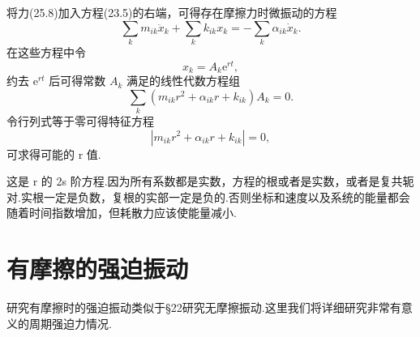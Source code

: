 将力(25.8)加入方程(23.5)的右端，可得存在摩擦力时微振动的方程
\begin{equation}
  \sum_km_{ik}\ddot{x}_k+\sum_kk_{ik}x_k=-\sum_k\alpha_{ik}\dot{x}_k.
\end{equation}
在这些方程中令
\begin{equation*}
  x_k=A_k\mathrm{e}^{rt},
\end{equation*}
约去 $\mathrm{e}^{rt}$ 后可得常数 $A_k$ 满足的线性代数方程组
\begin{equation}
  \sum_k\left(m_{ik}r^2+\alpha_{ik}r+k_{ik}\right)A_k=0.
\end{equation}
令行列式等于零可得特征方程
\begin{equation}
  \left|m_{ik}r^2+\alpha_{ik}r+k_{ik}\right|=0,
\end{equation}
可求得可能的 r 值.

这是 r 的 2s 阶方程.因为所有系数都是实数，方程的根或者是实数，或者是复共轭对.实根一定是负数，复根的实部一定是负的.否则坐标和速度以及系统的能量都会随着时间指数增加，但耗散力应该使能量减小.

\section{有摩擦的强迫振动}

研究有摩擦时的强迫振动类似于§22研究无摩擦振动.这里我们将详细研究非常有意义的周期强迫力情况.

